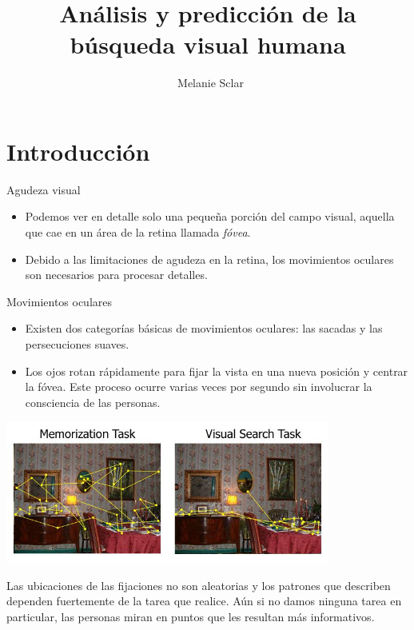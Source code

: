 \documentclass[compress]{beamer}
\title[Análisis y predicción de la búsqueda visual humana] %
{Análisis y predicción de la búsqueda visual humana}
\author[Melanie Sclar] %
{~Melanie Sclar}
\institute[UBA] %
{
  Facultad de Ciencias Exactas y Naturales\\
  Universidad de Buenos Aires
}
\begin{document}
\begin{frame}
  \titlepage
\end{frame}

\section{Introducción}
\begin{frame}{Agudeza visual}
\begin{itemize}
\item Podemos ver en detalle solo una pequeña porción del campo visual, aquella que cae en un área de la retina llamada \textit{fóvea}.
\item Debido a las limitaciones de agudeza en la retina, los movimientos oculares son necesarios para procesar detalles.
\end{itemize}
\end{frame}

\begin{frame}{Movimientos oculares}
\begin{itemize}
\item Existen dos categorías básicas de movimientos oculares: las sacadas y las persecuciones suaves.
\item Los ojos rotan rápidamente para fijar la vista en una nueva posición y centrar la fóvea. Este proceso ocurre varias veces por segundo sin involucrar la consciencia de las personas.
\end{itemize}
\end{frame}

\begin{frame}
\begin{center}
\includegraphics[width=0.8\textwidth]{images/castelhano-fixations.jpg}
\end{center}

Las ubicaciones de las fijaciones no son aleatorias y los patrones que describen dependen fuertemente de la tarea que realice. Aún si no damos ninguna tarea en particular, las personas miran en puntos que les resultan más informativos.
\end{frame}
\end{document}
